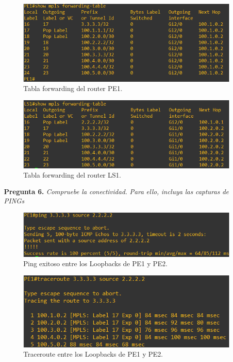 \documentclass[a4paper, 12pt]{report}
\begin{document}
\begin{figure}[H]
	\centering
	\includegraphics[scale=0.8]{forwardingtablepe1.png}
	\caption{Tabla forwarding del router PE1.}
	\label{fig:forwardingtablepe1}
\end{figure}

\begin{figure}[H]
	\centering
	\includegraphics[scale=0.8]{forwardingtablels1.png}
	\caption{Tabla forwarding del router LS1.}
	\label{fig:forwardingtablels1}
\end{figure}

\textbf{Pregunta 6.}
\textit{Compruebe la conectividad. Para ello, incluya las capturas de PINGs}
\begin{figure}[H]
	\centering
	\includegraphics[scale=0.8]{pingpe1pe2.png}
	\caption{Ping exitoso entre los Loopbacks de PE1 y PE2.}
	\label{fig:pingpe1pe2}
\end{figure}

\begin{figure}[H]
	\centering
	\includegraphics[scale=0.8]{traceroutepe1pe2.png}
	\caption{Traceroute entre los Loopbacks de PE1 y PE2.}
	\label{fig:traceroutepe1pe2}
\end{figure}
\end{document}

